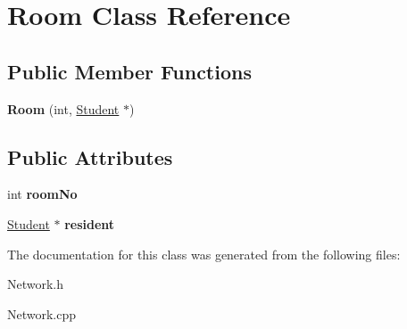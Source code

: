 \hypertarget{classRoom}{\section{\-Room \-Class \-Reference}
\label{classRoom}
}
\subsection*{\-Public \-Member \-Functions}
\begin{DoxyCompactItemize}
\item 
\hypertarget{classRoom_a6b16c8697489e6f528b9861fbc7b76e4}{{\bfseries \-Room} (int, \hyperlink{classStudent}{\-Student} $\ast$)}\label{classRoom_a6b16c8697489e6f528b9861fbc7b76e4}

\end{DoxyCompactItemize}
\subsection*{\-Public \-Attributes}
\begin{DoxyCompactItemize}
\item 
\hypertarget{classRoom_aa5f79f240979a561a548f84b45da64ce}{int {\bfseries room\-No}}\label{classRoom_aa5f79f240979a561a548f84b45da64ce}

\item 
\hypertarget{classRoom_a2a2ff794f9f83a4b5fe776eee5404efe}{\hyperlink{classStudent}{\-Student} $\ast$ {\bfseries resident}}\label{classRoom_a2a2ff794f9f83a4b5fe776eee5404efe}

\end{DoxyCompactItemize}


\-The documentation for this class was generated from the following files\-:\begin{DoxyCompactItemize}
\item 
\-Network.\-h\item 
\-Network.\-cpp\end{DoxyCompactItemize}

